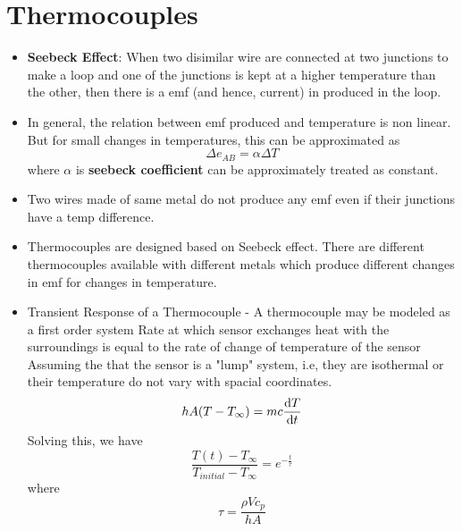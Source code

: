 \documentclass{article}
\begin{document}
\section{Thermocouples}
	\begin{itemize}
		\item \textbf{Seebeck Effect}: When two disimilar wire are connected at two junctions to make a loop and one of the junctions is kept at a higher temperature than the other, then there is a emf (and hence, current) in produced in the loop. 
		\item In general, the relation between emf produced and temperature is non linear. But for small changes in temperatures, this can be approximated as 
		\[\Delta e_{AB} = \alpha \Delta T\] 
		where $\alpha$ is \textbf{seebeck coefficient} can be approximately treated as constant. 
		\item Two wires made of same metal do not produce any emf even if their junctions have a temp difference.
		\item Thermocouples are designed based on Seebeck effect. There are different thermocouples available with different metals which produce different changes in emf for changes in temperature.
		\item Transient Response of a Thermocouple
			- A thermocouple may be modeled as a first order system 
			Rate at which sensor exchanges heat with the surroundings is equal to the rate of change of temperature of the sensor
			Assuming the that the sensor is a "lump" system, i.e, they are isothermal or their temperature do not vary with spacial coordinates.
			\[hA(T-T_\infty) = mc \dv{T}{t}\]
			Solving this, we have 
			\[\frac{T(t) - T_\infty}{T_{initial}- T_\infty} = e^{-\frac{t}{\tau}}\]
			where 
			\[\tau= \frac{\rho V c_p}{hA}\]
	\end{itemize}
\end{document}
